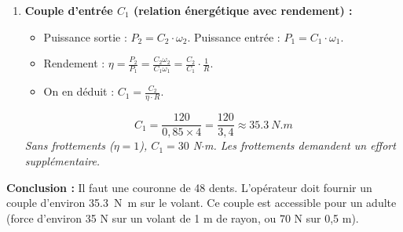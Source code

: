 \documentclass[11pt]{article}
\begin{document}
\begin{exoresolu}
\begin{enumerate}
        \item \textbf{Couple d'entrée $C_1$ (relation énergétique avec rendement) :}
              \begin{itemize}
                  \item Puissance sortie : $P_2 = C_2 \cdot \omega_2$. Puissance entrée : $P_1 = C_1 \cdot \omega_1$.
                  \item Rendement : $\eta = \frac{P_2}{P_1} = \frac{C_2 \omega_2}{C_1 \omega_1} = \frac{C_2}{C_1} \cdot \frac{1}{R}$.
                  \item On en déduit : $C_1 = \frac{C_2}{\eta \cdot R}$.
              \end{itemize}
              \[
              C_1 = \frac{120}{0,85 \times 4} = \frac{120}{3,4} \approx \SI{35,3}{N.m}
              \]
              \emph{Sans frottements ($\eta=1$), $C_1 = 30$ N$\cdot$m. Les frottements demandent un effort supplémentaire.}
    \end{enumerate}
    \textbf{Conclusion :} Il faut une couronne de 48 dents. L'opérateur doit fournir un couple d'environ \SI{35,3}{N.m} sur le volant. Ce couple est accessible pour un adulte (force d'environ 35 N sur un volant de 1 m de rayon, ou 70 N sur 0,5 m).
\end{exoresolu}
\end{document}
